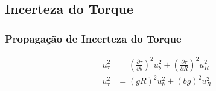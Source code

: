 \documentclass[a4papper, 10pt]{article}
\begin{document}
\subsection{Incerteza do Torque}
\vspace{0.10 cm}
\subsubsection{Propagação de Incerteza do Torque}
\vspace{0.10 cm}
\begin{center}
\begin{equation*}
\boxed{
\begin{aligned}
u_\tau^2 &= \left(\frac{\partial \tau}{\partial b}\right)^2 u_b^2 + \left(\frac{\partial \tau}{\partial R}\right)^2 u_R^2 \\
u_\tau^2 &= \left(gR\right)^2 u_b^2 + \left(bg\right)^2 u_R^2
\end{aligned}
}
\end{equation*}
\end{center}
\vspace{0.10 cm}
\end{document}
